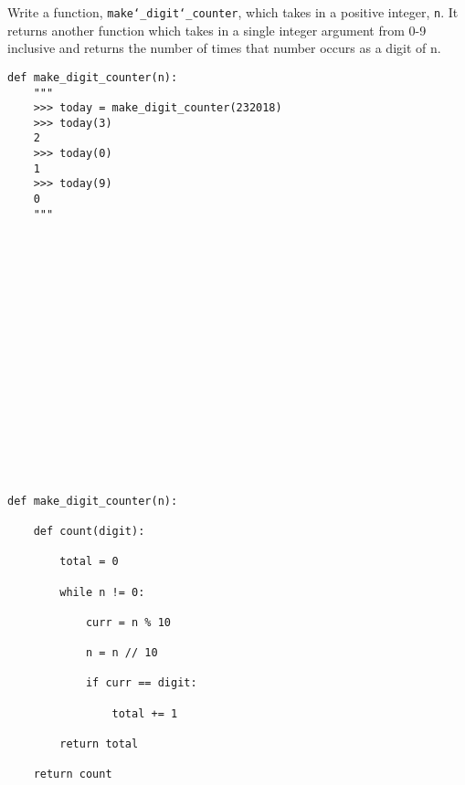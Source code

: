 \begin{blocksection}
\question Write a function, \texttt{make\char`_digit\char`_counter}, which takes in a positive integer, \texttt{n}. It returns another function which takes in a single integer argument from 0-9 inclusive and returns the number of times that number occurs as a digit of n.
\begin{lstlisting}
def make_digit_counter(n):
	"""
	>>> today = make_digit_counter(232018)
	>>> today(3)
	2
	>>> today(0)
	1
	>>> today(9)
	0
	"""
	
	
	
	
	
	
	
	
	
	
	
	
	
	
	
	


\end{lstlisting}

\begin{solution}
\begin{lstlisting}
def make_digit_counter(n):

	def count(digit):
	
		total = 0
		
		while n != 0:
		
			curr = n % 10
			
			n = n // 10
			
			if curr == digit:
			
				total += 1
				
		return total
		
	return count


\end{lstlisting}
\end{solution}
\end{blocksection}